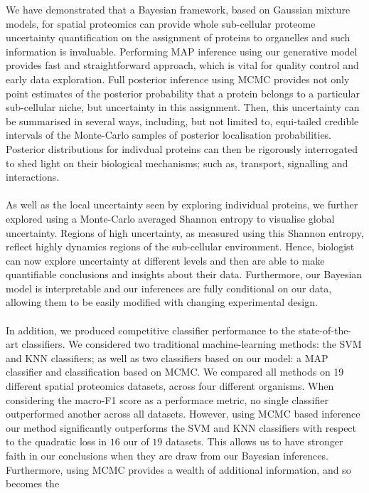 \documentclass[12pt,english]{article}
\begin{document}
We have demonstrated that a Bayesian framework, based on Gaussian
mixture models, for spatial proteomics can provide whole sub-cellular
proteome uncertainty quantification on the assignment of proteins to
organelles and such information is invaluable. Performing MAP
inference using our generative model provides fast and
straightforward approach, which is vital for quality control and early data
exploration. Full posterior inference using MCMC provides not only
point estimates of the posterior probability that a protein belongs to
a particular sub-cellular niche, but uncertainty in this
assignment. Then, this uncertainty can be summarised in several ways,
including, but not limited to, equi-tailed credible intervals of the
Monte-Carlo samples of posterior localisation probabilities.
Posterior distributions for indivdual proteins can then be rigorously
interrogated to shed light on their biological mechanisms; such as,
transport, signalling and interactions.
\\
\\
As well as the local uncertainty seen by exploring individual
proteins, we further explored using a Monte-Carlo averaged Shannon
entropy to visualise global uncertainty. Regions of high uncertainty,
as measured using this Shannon entropy, reflect highly dynamics
regions of the sub-cellular environment.  Hence, biologist can now
explore uncertainty at different levels and then are able to make
quantifiable conclusions and insights about their data.  Furthermore,
our Bayesian model is interpretable and our inferences are fully
conditional on our data, allowing them to be easily modified with
changing experimental design.
\\
\\
In addition, we produced competitive classifier performance to the
state-of-the-art classifiers. We considered two traditional
machine-learning methods: the SVM and KNN classifiers; as well as two
classifiers based on our model: a MAP classifier and
classification based on MCMC. We compared all methods on 19 different
spatial proteomics datasets, across four different organisms. When
considering the macro-F1 score as a performace metric, no single
classifier outperformed another across all datasets. However, using
MCMC based inference our method significantly outperforms the SVM and
KNN classifiers with respect to the quadratic loss in $16$ our of $19$
datasets. This allows us to have stronger faith in our conclusions
when they are draw from our Bayesian inferences. Furthermore, using
MCMC provides a wealth of additional information, and so becomes the
\end{document}
